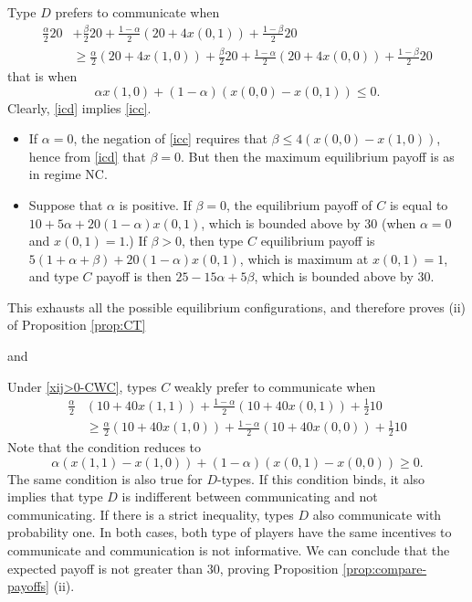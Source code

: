 \documentclass[12pt]{article}
\theoremstyle{break}
\begin{document}
\begin{enumerate}[(a)]
\begin{equation}
\end{equation}
%
Type $D$ prefers to communicate when
%
\begin{align*}
	\frac{\alpha}{2}20&+\frac{\beta}{2}20+\frac{1-\alpha}{2}(20+4x(0,1))+\frac{1-\beta}{2}20\\ 
	&\geq \frac{\alpha}{2}(20+4x(1,0))+\frac{\beta}{2}20+\frac{1-\alpha}{2}(20+4x(0,0))+\frac{1-\beta}{2}20
\end{align*}
%
that is when%
\begin{equation}\label{icd}
	\alpha x(1,0)+(1-\alpha)(x(0,0)-x(0,1))\leq 0.
\end{equation}
%
Clearly, \eqref{icd} implies \eqref{icc}. 
\begin{itemize}
	\item If $\alpha=0$, the negation of \eqref{icc} requires that $\beta\leq 4(x(0,0)-x(1,0))$, hence from \eqref{icd} that $\beta=0$. But then the maximum equilibrium payoff is as in regime NC.
	\item  Suppose that $\alpha$ is positive. If $\beta=0$, the equilibrium payoff of $C$ is equal to $10+5\alpha+20(1-\alpha)x(0,1)$, which is bounded above by $30$ (when $\alpha=0$ and $x(0,1)=1$.) If $\beta>0$, then type $C$ equilibrium payoff is $5(1+\alpha+\beta)+20(1-\alpha)x(0,1)$, which is maximum at $x(0,1)=1$, and type $C$ payoff is then $25-15\alpha+5\beta$, which is bounded above by $30$.
\end{itemize}

\end{enumerate}

This exhausts all the possible equilibrium configurations, and therefore proves (ii) of Proposition \ref{prop:CT}


and 


%   
%    

Under \eqref{xij>0-CWC}, types $C$ weakly prefer to communicate when
\begin{equation}\label{IC-comm-CWC}
	\begin{split}
	\frac{\alpha}{2}& (10+40x(1,1))+\frac{1-\alpha}{2}(10+40x(0,1))+\frac{1}{2}10\\ 
	&\geq \frac{\alpha}{2} (10+40x(1,0))+\frac{1-\alpha}{2}(10+40x(0,0))+\frac{1}{2}10
	\end{split}
\end{equation}
Note that the condition reduces to
\begin{equation}\label{CWC-NC-a,b>0}
	\alpha (x(1,1)-x(1,0))+(1-\alpha)(x(0,1)-x(0,0))\geq 0.
\end{equation}
%
The same condition is also true for $D$-types. If this condition binds, it also implies that type $D$ is indifferent between communicating and not communicating. If there is a strict inequality, types $D$ also communicate with probability one. In both cases, both type of players have the same incentives to communicate and communication is not informative. We can conclude that the expected payoff is not greater than $30$, proving Proposition \ref{prop:compare-payoffs} (ii).
\end{document}
